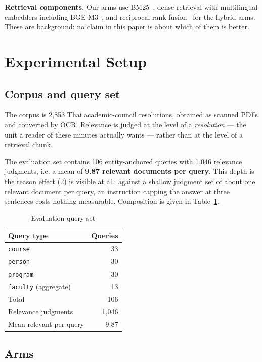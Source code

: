 \documentclass[conference]{IEEEtran}
\begin{document}
\textbf{Retrieval components.} Our arms use BM25~\cite{robertson2009bm25}, dense
retrieval with multilingual embedders including BGE-M3~\cite{chen2024bgem3}, and
reciprocal rank fusion~\cite{cormack2009rrf} for the hybrid arms. These are
background: no claim in this paper is about which of them is better.

\section{Experimental Setup}

\subsection{Corpus and query set}

The corpus is 2{,}853 Thai academic-council resolutions, obtained as scanned PDFs
and converted by OCR. Relevance is judged at the level of a \emph{resolution} ---
the unit a reader of these minutes actually wants --- rather than at the level of
a retrieval chunk.

The evaluation set contains 106 entity-anchored queries with 1{,}046 relevance
judgments, i.e. a mean of \textbf{9.87 relevant documents per query}. This depth
is the reason effect (2) is visible at all: against a shallow judgment set of
about one relevant document per query, an instruction capping the answer at three
sentences costs nothing measurable. Composition is given in
Table~\ref{tab:queries}.

\begin{table}[t]
\caption{Evaluation query set}
\label{tab:queries}
\centering
\begin{tabular}{lr}
\toprule
Query type & Queries \\
\midrule
\texttt{course} & 33 \\
\texttt{person} & 30 \\
\texttt{program} & 30 \\
\texttt{faculty} (aggregate) & 13 \\
\midrule
Total & 106 \\
Relevance judgments & 1{,}046 \\
Mean relevant per query & 9.87 \\
\bottomrule
\end{tabular}
\end{table}

\subsection{Arms}
\end{document}
